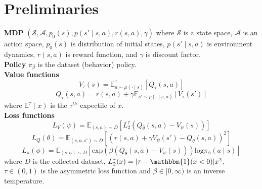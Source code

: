 \section{Preliminaries}
\label{section:problem}
\textbf{MDP} \( \left(\mathcal{S}, \mathcal{A}, p_0(s), p(s' \mid s, a), r(s, a), \gamma\right) \) where \(\mathcal{S}\) is a state space, \(\mathcal{A}\) is an action space, \(p_0(s)\) is  distribution of initial states, \(p(s' \mid s, a)\) is environment dynamics, \(r(s, a)\) is reward function, and \(\gamma\) is discount factor. \\
\textbf{Policy} \(\pi_\beta\) is the dataset (behavior) policy. \\
\textbf{Value functions} 
\begin{equation*}
    V_\tau(s) = \mathbb{E}_{a \sim \mu(\cdot \mid s)}^\tau\left[Q_\tau(s, a)\right]
\end{equation*}
\begin{equation*}
    Q_\tau(s, a) = r(s, a) + \gamma \mathbb{E}_{s' \sim p(\cdot \mid s, a)}\left[V_\tau(s')\right]
\end{equation*}
where \(\mathbb{E}^\tau(x)\) is the \(\tau^{th}\) expectile of \(x\).
\\
\textbf{Loss functions}
\begin{equation*}
    L_V(\psi) = \mathbb{E}_{(s, a) \sim D}\left[L_2^\tau(Q_{\hat{\theta}}(s, a)-V_\psi(s))\right]
\end{equation*}
\begin{equation*}
    L_Q(\theta) = \mathbb{E}_{(s, a, s') \sim D}\left[(r(s, a) + \gamma V_\psi (s') - Q_\theta (s, a))^2\right]
\end{equation*}
\begin{equation*}
    L_\pi(\phi) = \mathbb{E}_{(s,a) \sim D}\left[\text{exp}(\beta (Q_{\hat{\theta}}(s, a)-V_\psi(s)))\text{log}\pi_\phi(a \mid s)\right]
\end{equation*}
where \(D\) is the collected dataset, \(L_2^\tau(x) = |\tau - \mathbbm{1}(x < 0)|x^2\), \(\tau \in (0, 1)\) is the asymmetric loss function and \(\beta \in [0, \infty)\) is an inverse temperature.